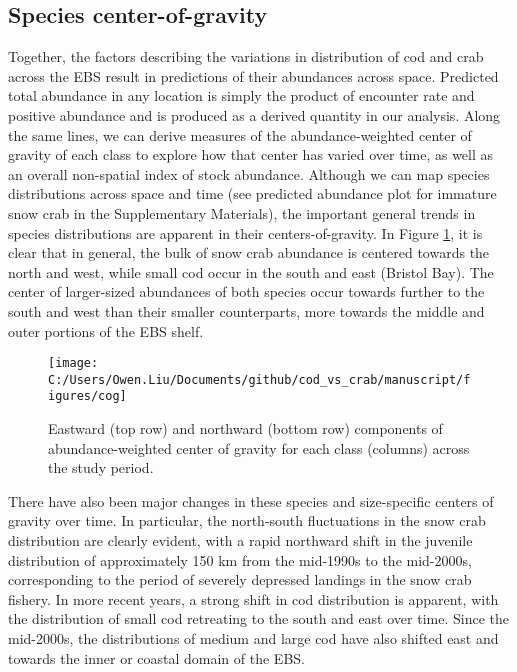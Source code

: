 \documentclass[11pt,]{article}
\begin{document}
\hypertarget{species-center-of-gravity}{%
\subsection{Species center-of-gravity}\label{species-center-of-gravity}}

Together, the factors describing the variations in distribution of cod and crab across the EBS result in predictions of their abundances across space. Predicted total abundance in any location is simply the product of encounter rate and positive abundance and is produced as a derived quantity in our analysis. Along the same lines, we can derive measures of the abundance-weighted center of gravity of each class to explore how that center has varied over time, as well as an overall non-spatial index of stock abundance. Although we can map species distributions across space and time (see predicted abundance plot for immature snow crab in the Supplementary Materials), the important general trends in species distributions are apparent in their centers-of-gravity. In Figure \ref{fig:cog}, it is clear that in general, the bulk of snow crab abundance is centered towards the north and west, while small cod occur in the south and east (Bristol Bay). The center of larger-sized abundances of both species occur towards further to the south and west than their smaller counterparts, more towards the middle and outer portions of the EBS shelf.

\begin{figure}
\texttt{[image: C:/Users/Owen.Liu/Documents/github/cod\_vs\_crab/manuscript/figures/cog]} \caption{Eastward (top row) and northward (bottom row) components of abundance-weighted center of gravity for each class (columns) across the study period.}\label{fig:cog}
\end{figure}

There have also been major changes in these species and size-specific centers of gravity over time. In particular, the north-south fluctuations in the snow crab distribution are clearly evident, with a rapid northward shift in the juvenile distribution of approximately 150 km from the mid-1990s to the mid-2000s, corresponding to the period of severely depressed landings in the snow crab fishery. In more recent years, a strong shift in cod distribution is apparent, with the distribution of small cod retreating to the south and east over time. Since the mid-2000s, the distributions of medium and large cod have also shifted east and towards the inner or coastal domain of the EBS.
\end{document}
